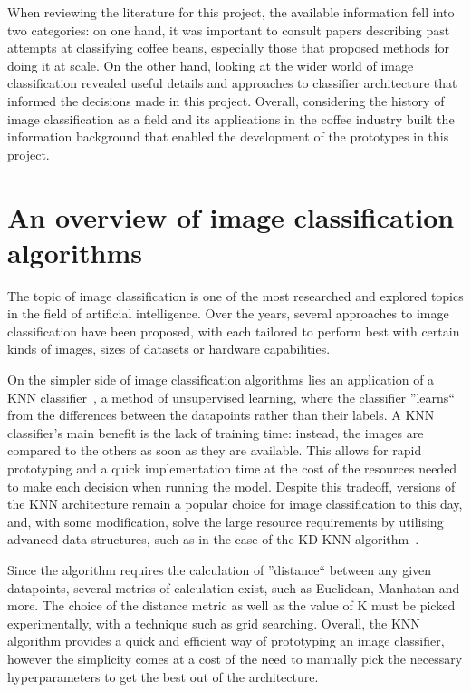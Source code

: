 When reviewing the literature for this project, the available information fell into
two categories: on one hand, it was important to consult papers describing past attempts
at classifying coffee beans, especially those that proposed methods for doing it
at scale.
On the other hand, looking at the wider world of image classification
revealed useful details and approaches to classifier architecture that informed
the decisions made in this project.
Overall, considering the history of image
classification as a field and its applications in the coffee industry built the
information background that enabled the development of the prototypes in this
project.

\section{An overview of image classification algorithms}
\label{sec:lit-review-general} The topic of image classification is one of the
most researched and explored topics in the field of artificial intelligence.
Over
the years, several approaches to image classification have been proposed, with each
tailored to perform best with certain kinds of images, sizes of datasets or
hardware capabilities.

On the simpler side of image classification algorithms lies an application of a
KNN classifier~\cite{knnOverview}, a method of unsupervised learning, where the
classifier ''learns`` from the differences between the datapoints rather than
their labels.
A KNN classifier's main benefit is the lack of training time:
instead, the images are compared to the others as soon as they are available.
This allows for rapid prototyping and a quick implementation time at the cost of
the resources needed to make each decision when running the model.
Despite this tradeoff,
versions of the KNN architecture remain a popular choice for image
classification to this day, and, with some modification, solve the large resource
requirements by utilising advanced data structures, such as in the case of the
KD-KNN algorithm~\cite{kdtreeKNN}.

Since the algorithm requires the calculation of ''distance`` between any given
datapoints, several metrics of calculation exist, such as Euclidean, Manhatan and
more.
The choice of the distance metric as well as the value of K must be picked
experimentally, with a technique such as grid searching.
Overall, the KNN algorithm
provides a quick and efficient way of prototyping an image classifier, however
the simplicity comes at a cost of the need to manually pick the necessary
hyperparameters to get the best out of the architecture.

